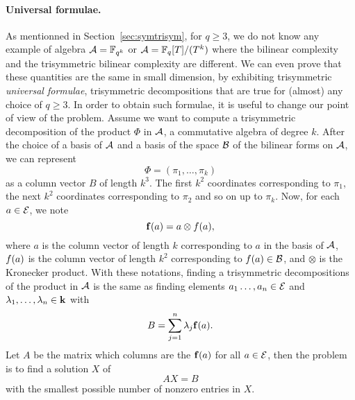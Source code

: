 \documentclass[11pt]{article}
\begin{document}
\paragraph{Universal formulae.}
As mentionned in Section~\ref{sec:symtrisym}, for $q\geq3$, we do not know any example of
algebra $\mathcal{A}=\mathbb{F}_{q^k}$ or $\mathcal{A}=\mathbb{F}_{q}[T]/(T^k)$ where the bilinear complexity and
the trisymmetric bilinear complexity are different. We can even prove that these
quantities are the same in small dimension, by exhibiting trisymmetric \emph{universal
formulae}, \ie trisymmetric decompositions that are true for (almost) any choice
of $q\geq3$. In order to obtain such formulae, it is useful to
change our point of view of the problem. Assume we want to compute a
trisymmetric decomposition of the product $\Phi$ in $\mathcal{A}$, a commutative algebra
of degree $k$. After the choice of a basis of $\mathcal{A}$ and a basis of the space $\mathcal{B}$
of the bilinear forms on $\mathcal{A}$, we can represent
\[
  \Phi=(\pi_1, \dots, \pi_k)
\]
as a column vector $B$ of length $k^3$. The first $k^2$ coordinates corresponding
to $\pi_1$, the next $k^2$ coordinates corresponding to $\pi_2$ and so on up to
$\pi_k$. Now, for each $a\in\mathcal{E}$, we note
\[
  \mathbf{f}(a) = a\otimes f(a),
\] 
where $a$ is the column vector of length $k$ corresponding to $a$ in the basis
of $\mathcal{A}$, $f(a)$ is the column vector of length $k^2$ corresponding
to $f(a)\in\mathcal{B}$, and $\otimes$ is the Kronecker product. With these notations,
finding a trisymmetric decompositions of the product in
$\mathcal{A}$ is the same as finding elements $a_1\dots,
a_n\in\mathcal{E}$ and $\lambda_1, \dots, \lambda_n\in\mathbf{k}$ with
\[
  B = \sum_{j=1}^n \lambda_j\mathbf{f}(a).
\]
Let $A$ be the matrix which columns are the $\mathbf{f}(a)$ for all $a\in\mathcal{E}$, then the
problem is to find a solution $X$ of
\[
  AX = B
\]
with the smallest possible number of nonzero entries in $X$.
\end{document}

